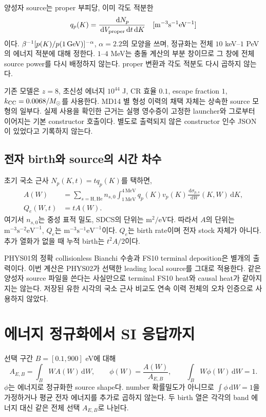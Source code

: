 \documentclass[11pt,a4paper]{article}
\newcommand{\dd}{\,\mathrm{d}}
\begin{document}
양성자 source는 proper 부피당, 이미 각도 적분한
\[
q_p(K)=\frac{\dd N_p}{\dd V_{\rm proper}\dd t\dd K}
\quad[\mathrm{m^{-3}s^{-1}eV^{-1}}]
\]
이다. \(\beta^{-1}[p(K)/p(1\,{\rm GeV})]^{-\alpha}\), \(\alpha=2.2\)의 모양을 쓰며,
정규화는 전체 \(10\) keV--\(1\) PeV의 에너지 적분에 대해 정한다. \(1\)--\(4\) MeV는
충돌 계산의 부분 창이므로 그 창에 전체 source power를 다시 배정하지 않는다.
proper 변환과 각도 적분도 다시 곱하지 않는다.\cite{source}

기존 모델은 \(z=8\), 초신성 에너지 \(10^{44}\) J, CR 효율 \(0.1\), escape fraction \(1\),
\(k_{\rm CC}=0.0068/M_\odot\)를 사용한다. MD14 별 형성 이력의 채택 자체는 상속한 source 모형의
일부다.\cite{md14} 실제 사용을 확인한 근거는 실행 영수증이 고정한 launcher와 그로부터 이어지는
기본 constructor 호출이다. 별도로 출력되지 않은 constructor 인수 JSON이 있었다고
기록하지 않는다.\cite{source}

\subsection{전자 birth와 source의 시간 차수}

초기 국소 근사 \(N_p(K,t)=tq_p(K)\)를 택하면,
\begin{align}
A(W)&=\sum_{s=\mathrm{H,He}}n_{s,0}
\int_{1\,\mathrm{MeV}}^{4\,\mathrm{MeV}}
q_p(K)v_p(K)\frac{\dd\sigma_{p,s}}{\dd W}(K,W)\dd K,\\
Q_e(W,t)&=tA(W).
\end{align}
여기서 \(n_{s,0}\)는 중성 표적 밀도, SDCS의 단위는 \(\mathrm{m^2/eV}\)다.
따라서 \(A\)의 단위는 \(\mathrm{m^{-3}s^{-2}eV^{-1}}\), \(Q_e\)는
\(\mathrm{m^{-3}s^{-1}eV^{-1}}\)이다. \(Q_e\)는 birth rate이며 전자 stock 자체가 아니다.
추가 열화가 없을 때 누적 birth는 \(t^2A/2\)이다.\cite{source}

PHYS01의 정확 collisionless Bianchi 수송과 FS10 terminal deposition은 별개의 출력이다.
이번 계산은 PHYS02가 선택한 leading local source를 그대로 적용한다. 같은 양성자 source 파일을
쓴다는 사실만으로 terminal FS10 heat와 causal heat가 같아지지는 않는다. 저장된 유한 시각의
국소 근사 비교도 연속 이력 전체의 오차 인증으로 사용하지 않았다.

\section{에너지 정규화에서 SI 응답까지}

선택 구간 \(B=[0.1,900]\) eV에 대해
\[
A_{E,B}=\int_B WA(W)\dd W,\qquad
\phi(W)=\frac{A(W)}{A_{E,B}},\qquad
\int_BW\phi(W)\dd W=1.
\]
\(\phi\)는 에너지로 정규화한 source shape다. number 확률밀도가 아니므로
\(\int\phi\dd W=1\)을 가정하거나 평균 전자 에너지를 추가로 곱하지 않는다.
두 birth 열은 각각의 band 에너지 대신 같은 전체 선택 \(A_{E,B}\)로 나뉜다.\cite{source}
\end{document}
